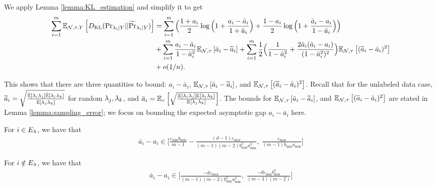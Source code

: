 We apply Lemma \ref{lemma:KL_estimation} and simplify it to get
\begin{align}
    \sum_{i = 1}^m \mathbb{E}_{\mathcal{N}, \tau, Y}\left[D_{\mathrm{KL}} (\mathrm{Pr}_{\lambda_i | Y} || \widetilde{\Pr}_{\lambda_i | Y} )\right] &= \sum_{i = 1}^m \Big(\frac{1 + a_i}{2} \log \Big(1 + \frac{a_i - \bar{a}_i}{1 + \bar{a}_i}\Big) + \frac{1 - a_i}{2} \log \Big(1 + \frac{\bar{a}_i - a_i}{1 - \bar{a}_i} \Big)\Big)  \\
    &+ \sum_{i = 1}^m \frac{a_i - \bar{a}_i}{1 - \bar{a}_i^2} \mathbb{E}_{\mathcal{N}, \tau}\left[\bar{a}_i - \widetilde{a}_i \right] 
    + \sum_{i = 1}^m \frac{1}{2}\Big( \frac{1}{1 - \bar{a}_i^2} + \frac{2\bar{a}_i(\bar{a}_i - a_i)}{(1 - \bar{a}_i^2)^2}\Big) \mathbb{E}_{\mathcal{N}, \tau}\left[(\widetilde{a}_i - \bar{a}_i)^2\right] \\
    &+ o(1/n).
\end{align}

This shows that there are three quantities to bound: $a_i - \bar{a}_i$, $\mathbb{E}_{\mathcal{N}, \tau}\left[\bar{a}_i - \widetilde{a}_i\right]$, and $\mathbb{E}_{\mathcal{N}, \tau}\left[(\widetilde{a}_i - \bar{a}_i)^2\right]$. Recall that for the unlabeled data case, $\widetilde{a}_i = \sqrt{\frac{\hat{\mathbb{E}}\left[\lambda_i \lambda_j\right] \hat{\mathbb{E}}\left[\lambda_i \lambda_k\right]}{\hat{\mathbb{E}}\left[\lambda_j \lambda_k\right]}}$ for random $\lambda_j, \lambda_k$, and $\bar{a}_i = \mathbb{E}_{\tau}\left[\sqrt{\frac{\mathbb{E}_{}\left[\lambda_i \lambda_j\right] \mathbb{E}_{}\left[\lambda_i \lambda_k\right]}{\mathbb{E}_{}\left[\lambda_j \lambda_k\right]}}\right]$. The bounds for $\mathbb{E}_{\mathcal{N}, \tau}\left[\bar{a}_i - \widetilde{a}_i\right]$, and $\mathbb{E}_{\mathcal{N}, \tau}\left[(\widetilde{a}_i - \bar{a}_i)^2\right]$ are stated in Lemma \ref{lemma:sampling_error}; we focus on bounding the expected asymptotic gap $a_i - \bar{a}_i$ here. 

\begin{lemma}
For $i \in E_{\lambda}$, we have that
\begin{align}
    \bar{a}_i - a_i \in \bigg[\frac{\varepsilon_{\min} b_{\min}}{m - 1} - \frac{(d - 1)\varepsilon_{\max}}{(m - 1)(m - 2) b_{\min}^2 a_{\min}^2}, \; \frac{\varepsilon_{\max}}{(m - 1) b_{\min}a_{\min}} \bigg]
\end{align}

For $i \notin E_{\lambda}$, we have that
\begin{align}
    \bar{a}_i - a_i \in \bigg[\frac{-d \varepsilon_{\max}}{(m - 1)(m - 2) b_{\min}^2 a_{\min}^2}, \; \frac{-d \varepsilon_{\min} b_{\min}^2}{(m - 1)(m - 2)} \bigg]
\end{align}
\end{lemma}

